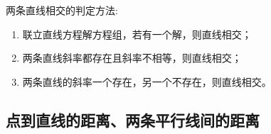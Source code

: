 \begin{note}
   两条直线相交的判定方法:
   \begin{enumerate}
       \item 联立直线方程解方程组，若有一个解，则直线相交；
       \item 两条直线斜率都存在且斜率不相等，则直线相交；
       \item 两条直线的斜率一个存在，另一个不存在，则直线相交。
   \end{enumerate} 
\end{note}


\subsection{点到直线的距离、两条平行线间的距离}


\newpage
\begin{problemset}
\end{problemset}